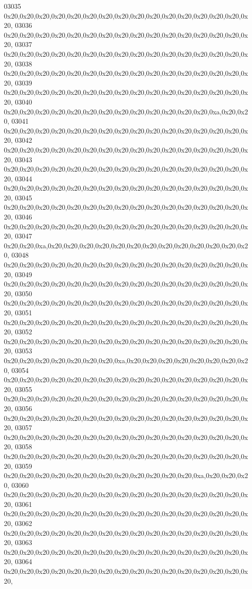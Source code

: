 \begin{DoxyCode}
03035   0x20,0x20,0x20,0x20,0x20,0x20,0x20,0x20,0x20,0x20,0x20,0x20,0x20,0x20,0x20,0x20,
03036   0x20,0x20,0x20,0x20,0x20,0x20,0x20,0x20,0x20,0x20,0x20,0x20,0x20,0x20,0x20,0x20,
03037   0x20,0x20,0x20,0x20,0x20,0x20,0x20,0x20,0x20,0x20,0x20,0x20,0x20,0x20,0x20,0x20,
03038   0x20,0x20,0x20,0x20,0x20,0x20,0x20,0x20,0x20,0x20,0x20,0x20,0x20,0x20,0x20,0x20,
03039   0x20,0x20,0x20,0x20,0x20,0x20,0x20,0x20,0x20,0x20,0x20,0x20,0x20,0x20,0x20,0x20,
03040   0x20,0x20,0x20,0x20,0x20,0x20,0x20,0x20,0x20,0x20,0x20,0x20,0x20,0xa,0x20,0x20,
03041   0x20,0x20,0x20,0x20,0x20,0x20,0x20,0x20,0x20,0x20,0x20,0x20,0x20,0x20,0x20,0x20,
03042   0x20,0x20,0x20,0x20,0x20,0x20,0x20,0x20,0x20,0x20,0x20,0x20,0x20,0x20,0x20,0x20,
03043   0x20,0x20,0x20,0x20,0x20,0x20,0x20,0x20,0x20,0x20,0x20,0x20,0x20,0x20,0x20,0x20,
03044   0x20,0x20,0x20,0x20,0x20,0x20,0x20,0x20,0x20,0x20,0x20,0x20,0x20,0x20,0x20,0x20,
03045   0x20,0x20,0x20,0x20,0x20,0x20,0x20,0x20,0x20,0x20,0x20,0x20,0x20,0x20,0x20,0x20,
03046   0x20,0x20,0x20,0x20,0x20,0x20,0x20,0x20,0x20,0x20,0x20,0x20,0x20,0x20,0x20,0x20,
03047   0x20,0x20,0xa,0x20,0x20,0x20,0x20,0x20,0x20,0x20,0x20,0x20,0x20,0x20,0x20,0x20,
03048   0x20,0x20,0x20,0x20,0x20,0x20,0x20,0x20,0x20,0x20,0x20,0x20,0x20,0x20,0x20,0x20,
03049   0x20,0x20,0x20,0x20,0x20,0x20,0x20,0x20,0x20,0x20,0x20,0x20,0x20,0x20,0x20,0x20,
03050   0x20,0x20,0x20,0x20,0x20,0x20,0x20,0x20,0x20,0x20,0x20,0x20,0x20,0x20,0x20,0x20,
03051   0x20,0x20,0x20,0x20,0x20,0x20,0x20,0x20,0x20,0x20,0x20,0x20,0x20,0x20,0x20,0x20,
03052   0x20,0x20,0x20,0x20,0x20,0x20,0x20,0x20,0x20,0x20,0x20,0x20,0x20,0x20,0x20,0x20,
03053   0x20,0x20,0x20,0x20,0x20,0x20,0x20,0xa,0x20,0x20,0x20,0x20,0x20,0x20,0x20,0x20,
03054   0x20,0x20,0x20,0x20,0x20,0x20,0x20,0x20,0x20,0x20,0x20,0x20,0x20,0x20,0x20,0x20,
03055   0x20,0x20,0x20,0x20,0x20,0x20,0x20,0x20,0x20,0x20,0x20,0x20,0x20,0x20,0x20,0x20,
03056   0x20,0x20,0x20,0x20,0x20,0x20,0x20,0x20,0x20,0x20,0x20,0x20,0x20,0x20,0x20,0x20,
03057   0x20,0x20,0x20,0x20,0x20,0x20,0x20,0x20,0x20,0x20,0x20,0x20,0x20,0x20,0x20,0x20,
03058   0x20,0x20,0x20,0x20,0x20,0x20,0x20,0x20,0x20,0x20,0x20,0x20,0x20,0x20,0x20,0x20,
03059   0x20,0x20,0x20,0x20,0x20,0x20,0x20,0x20,0x20,0x20,0x20,0x20,0xa,0x20,0x20,0x20,
03060   0x20,0x20,0x20,0x20,0x20,0x20,0x20,0x20,0x20,0x20,0x20,0x20,0x20,0x20,0x20,0x20,
03061   0x20,0x20,0x20,0x20,0x20,0x20,0x20,0x20,0x20,0x20,0x20,0x20,0x20,0x20,0x20,0x20,
03062   0x20,0x20,0x20,0x20,0x20,0x20,0x20,0x20,0x20,0x20,0x20,0x20,0x20,0x20,0x20,0x20,
03063   0x20,0x20,0x20,0x20,0x20,0x20,0x20,0x20,0x20,0x20,0x20,0x20,0x20,0x20,0x20,0x20,
03064   0x20,0x20,0x20,0x20,0x20,0x20,0x20,0x20,0x20,0x20,0x20,0x20,0x20,0x20,0x20,0x20,

\end{DoxyCode}
